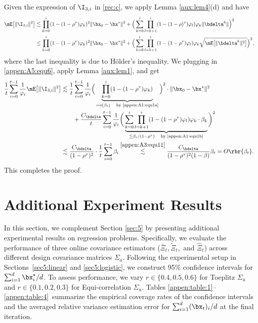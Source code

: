 Given the expression of $\I_{3,i}$ in \eqref{rec:c}, we apply Lemma \ref{aux:lem4}(d) and have
\begin{align*}
\mE\big[\|\I_{3, i}\|^2\big] &\lesssim \prod_{k=0}^i(1-(1-\rho^{\tau})\varphi_k)^2\|\bx_0-\bx^\star\|^2 + \Big(\sum_{k=0}^i\prod_{l=k+1}^i(1-(1-\rho)^\tau)\varphi_l) \varphi_k\|\bdelta^k\|\Big)^2\\
&\leq \prod_{k=0}^i(1-(1-\rho^{\tau})\varphi_k)^2\|\bx_0-\bx^\star\|^2 + \Big(\sum_{k=0}^i\prod_{l=k+1}^i(1-(1-\rho^\tau)\varphi_l) \varphi_k \sqrt{\mE\big[\|\bdelta^k\|^2\big]}\Big)^2,
\end{align*}
where the last inequality is due to H\"older's inequality. We plugging in \eqref{appen:A5:equ6}, apply Lemma \ref{aux:lem1}, and get
\begin{align}\label{appen:A5:equ15}
\frac{1}{t} \sum_{i=0}^{t-1} \frac{1}{\varphi_i} \mE\big[\|\I_{3, i}\|^2\big] &\lesssim  \frac{1}{t} \sum_{i=0}^{t-1} \frac{1}{\varphi_i} \Big(\underbrace{\prod_{k=0}^i(1-(1-\rho^{\tau})\varphi_k)}_{=o(\beta_i)\quad\text{by \eqref{appen:A1:equ1a}}}\Big)^2\cdot \|\bx_0-\bx^\star\|^2\nonumber\\
&\quad\quad + \frac{C_{\bdelta}}{t} \sum_{i=0}^{t-1} \frac{1}{\varphi_i}\bigg(\underbrace{\sum_{k=0}^i \prod_{l=k+1}^i (1-(1-\rho^\tau)\varphi_l) \varphi_k \cdot\beta_k}_{\lesssim \beta_i/(1-\rho^\tau)\quad\text{by \eqref{appen:A1:equ1b}}} \bigg)^2\nonumber\\
&\lesssim \frac{C_{\bdelta}}{(1-\rho^\tau)^2}\cdot \frac{1}{t}\sum_{i=0}^{t-1}\beta_i \stackrel{\eqref{appen:A3:equ11}}{\lesssim} \frac{C_{\bdelta}}{(1-\rho^\tau)^2(1-\beta)}\beta_t = O\rbr{\beta_t}.
\end{align}
This completes the proof.


\section{Additional Experiment Results}\label{appen:exp}

In this section, we complement Section \ref{sec:5} by presenting additional experimental results on regression problems. Specifically, we evaluate the performance of three online covariance estimators ($\bar{\Xi}_t, \tilde{\Xi}_t$,~and $\hat{\Xi}_t$) across different design covariance matrices $\Sigma_a$. Following the experimental setup in Sections~\ref{sec5:linear} and \ref{sec5:logistic}, we construct 95\% confidence intervals for $\sum_{i=1}^d \bx^\star_i / d$. To assess performance, we vary $r \in \{0.4, 0.5, 0.6\}$ for Toeplitz $\Sigma_a$ and $r \in \{0.1, 0.2, 0.3\}$ for Equi-correlation $\Sigma_a$. Tables \ref{appen:table:1}--\ref{appen:table:4}~summarize the empirical coverage rates of the confidence intervals and the averaged relative variance estimation error for $\sum_{i=1}^d (\bx_t)_i / d$ at the final iteration.



